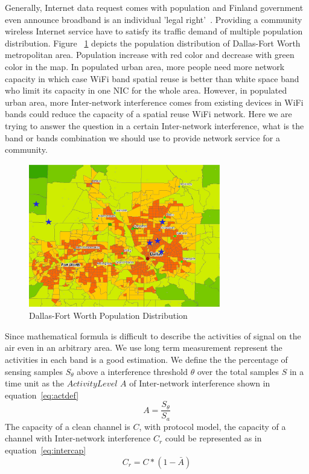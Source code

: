 Generally, Internet data request comes with population and Finland government even announce 
broadband is an individual 'legal right'~\cite{bbcfinland,rosston2011household}. Providing a community 
wireless Internet service have to satisfy its traffic demand of multiple population distribution. 
Figure ~\ref{fig:dfwpopulation} depicts the population distribution of Dallas-Fort Worth 
metropolitan area. Population increase with red color and decrease with green color in the map.
In populated urban area, more people need more network capacity in which case WiFi 
band spatial reuse is better than white space band who limit its capacity in one NIC for the whole area.
However, in populated urban area, more Inter-network interference comes from existing devices in WiFi
 bands could reduce the capacity of a spatial reuse WiFi network. 
 Here we are trying to answer the question in a certain Inter-network interference,
 what is the band or bands combination we should use to provide network service
  for a community.
	  
   \begin{figure}
   \centering
   \includegraphics[width=84mm]{figures/experimentloc}
   \vspace{-0.1in}
   \caption{Dallas-Fort Worth Population Distribution}                                                                 
   \label{fig:dfwpopulation}
   \end{figure}

Since mathematical formula is difficult to describe the activities of signal on the air even in an arbitrary area.
 We use long term measurement represent the activities in each band is a good
  estimation. We define the the percentage of sensing samples $S_\theta$ above a 
  interference threshold $\theta$ over the total samples $S$ in a time unit as the 
  {\it $Activity Level$} $A$ of Inter-network interference shown in equation~\ref{eq:actdef}
\begin{equation}
\label{eq:actdef}
A=\frac{S_\theta}{S_a}
\end{equation}
The capacity of a clean channel is $C$, with protocol model, the capacity of a channel with Inter-network
 interference $C_r$ could be represented as in equation~\ref{eq:intercap}
\begin{equation}
\label{eq:intercap}
C_r=C*(1-\bar{A})
\end{equation}

